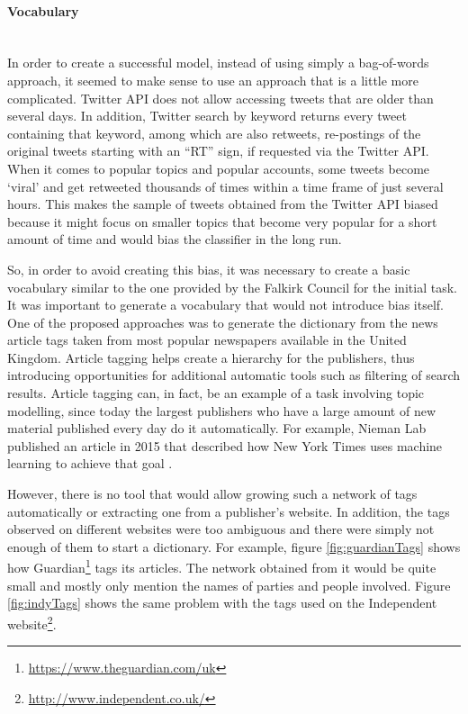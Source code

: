 \paragraph{Vocabulary}\mbox{}\\
In order to create a successful model, instead of using simply a bag-of-words approach, it seemed to make sense to use an approach that is a little more complicated. Twitter API does not allow accessing tweets that are older than several days. In addition, Twitter search by keyword returns every tweet containing that keyword, among which are also retweets, re-postings of the original tweets starting with an ``RT'' sign, if requested via the Twitter API. When it comes to popular topics and popular accounts, some tweets become `viral' and get retweeted thousands of times within a time frame of just several hours. This makes the sample of tweets obtained from the Twitter API biased because it might focus on smaller topics that become very popular for a short amount of time and would bias the classifier in the long run.

So, in order to avoid creating this bias, it was necessary to create a basic vocabulary similar to the one provided by the Falkirk Council for the initial task. It was important to generate a vocabulary that would not introduce bias itself. One of the proposed approaches was to generate the dictionary from the news article tags taken from most popular newspapers available in the United Kingdom. Article tagging helps create a hierarchy for the publishers, thus introducing opportunities for additional automatic tools such as filtering of search results. Article tagging can, in fact, be an example of a task involving topic modelling, since today the largest publishers who have a large amount of new material published every day do it automatically. For example, Nieman Lab published an article in 2015 that described how New York Times uses machine learning to achieve that goal \cite{niemanlab}.

However, there is no tool that would allow growing such a network of tags automatically or extracting one from a publisher's website. In addition, the tags observed on different websites were too ambiguous and there were simply not enough of them to start a dictionary. For example, figure \ref{fig:guardianTags} shows how Guardian\footnote{\url{https://www.theguardian.com/uk}} tags its articles. The network obtained from it would be quite small and mostly only mention the names of parties and people involved. Figure \ref{fig:indyTags} shows the same problem with the tags used on the Independent website\footnote{\url{http://www.independent.co.uk/}}.

